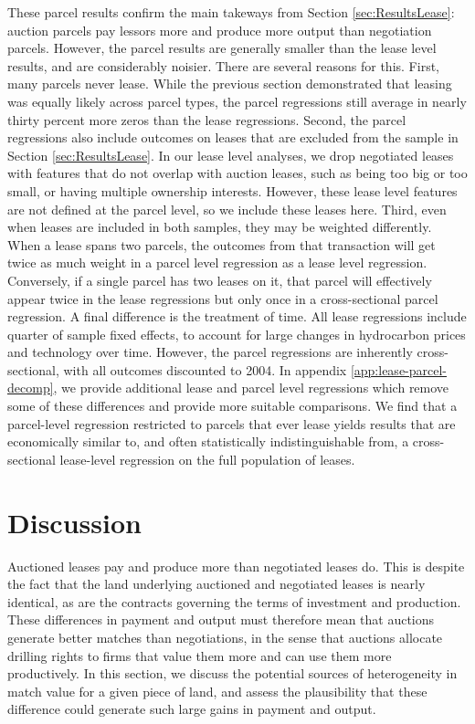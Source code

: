 These parcel results confirm the main takeways from Section \ref{sec:ResultsLease}: auction parcels pay lessors more and produce more output than negotiation parcels. However, the parcel results are generally smaller than the lease level results, and are considerably noisier. There are several reasons for this. First, many parcels never lease. While the previous section demonstrated that leasing was equally likely across parcel types, the parcel regressions still average in nearly thirty percent more zeros than the lease regressions. Second, the parcel regressions also include outcomes on leases that are excluded from the sample in Section \ref{sec:ResultsLease}. In our lease level analyses, we drop negotiated leases with features that do not overlap with auction leases, such as being too big or too small, or having multiple ownership interests. However, these lease level features are not defined at the parcel level, so we include these leases here. Third, even when leases are included in both samples, they may be weighted differently. When a lease spans two parcels, the outcomes from that transaction will get twice as much weight in a parcel level regression as a lease level regression. Conversely, if a single parcel has two leases on it, that parcel will effectively appear twice in the lease regressions but only once in a cross-sectional parcel regression. A final difference is the treatment of time. All lease regressions include quarter of sample fixed effects, to account for large changes in hydrocarbon prices and technology over time. However, the parcel regressions are inherently cross-sectional, with all outcomes discounted to 2004. In appendix \ref{app:lease-parcel-decomp}, we provide additional lease and parcel level regressions which remove some of these differences and provide more suitable comparisons. We find that a parcel-level regression restricted to parcels that ever lease yields results that are economically similar to, and often statistically indistinguishable from, a cross-sectional lease-level regression on the full population of leases. 

\section{Discussion \label{sec:Discussion}}

Auctioned leases pay and produce more than negotiated leases do. This is despite the fact that the land underlying auctioned and negotiated leases is nearly identical, as are the contracts governing the terms of investment and production. These differences in payment and output must therefore mean that auctions generate better matches than negotiations, in the sense that auctions allocate drilling rights to firms that value them more and can use them more productively.  In this section, we discuss the potential sources of heterogeneity in match value for a given piece of land, and assess the plausibility that these difference could generate such large gains in payment and output.

